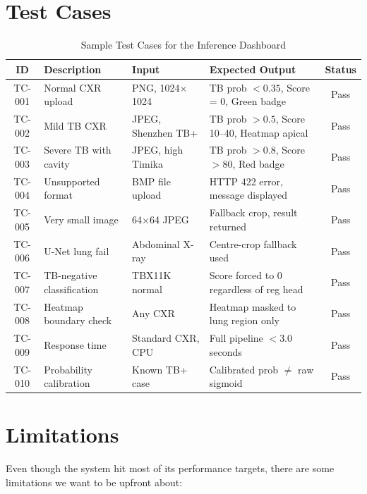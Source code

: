 \documentclass[12pt]{report}
\begin{document}
\section{Test Cases}

\begin{table}[H]
\centering
\caption{Sample Test Cases for the Inference Dashboard}
\small
\renewcommand{\arraystretch}{1.1}
\begin{tabular}{|c|p{3.5cm}|p{3cm}|p{3.5cm}|c|}
\hline
\textbf{ID} & \textbf{Description} & \textbf{Input} & \textbf{Expected Output} & \textbf{Status} \\
\hline
TC-001 & Normal CXR upload & PNG, 1024$\times$1024 & TB prob $< 0.35$, Score = 0, Green badge & Pass \\
TC-002 & Mild TB CXR & JPEG, Shenzhen TB+ & TB prob $> 0.5$, Score 10--40, Heatmap apical & Pass \\
TC-003 & Severe TB with cavity & JPEG, high Timika & TB prob $> 0.8$, Score $> 80$, Red badge & Pass \\
TC-004 & Unsupported format & BMP file upload & HTTP 422 error, message displayed & Pass \\
TC-005 & Very small image & 64$\times$64 JPEG & Fallback crop, result returned & Pass \\
TC-006 & U-Net lung fail & Abdominal X-ray & Centre-crop fallback used & Pass \\
TC-007 & TB-negative classification & TBX11K normal & Score forced to 0 regardless of reg head & Pass \\
TC-008 & Heatmap boundary check & Any CXR & Heatmap masked to lung region only & Pass \\
TC-009 & Response time & Standard CXR, CPU & Full pipeline $< 3.0$ seconds & Pass \\
TC-010 & Probability calibration & Known TB+ case & Calibrated prob $\neq$ raw sigmoid & Pass \\
\hline
\end{tabular}
\end{table}

\section{Limitations}

Even though the system hit most of its performance targets, there are some limitations we want to be upfront about:
\end{document}
